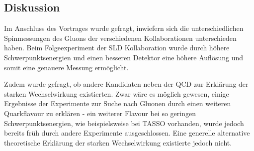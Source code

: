 \subsection{Diskussion}
Im Anschluss des Vortrages wurde gefragt, inwiefern sich die unterschiedlichen Spinmessungen des Gluons der verschiedenen Kollaborationen unterschieden haben.
Beim Folgeexperiment der SLD Kollaboration wurde durch höhere Schwerpunktsenergien und einen besseren Detektor eine höhere Auflösung und somit eine genauere Messung ermöglicht.

Zudem wurde gefragt, ob andere Kandidaten neben der QCD zur Erklärung der starken Wechselwirkung existierten.
Zwar wäre es möglich gewesen, einige Ergebnisse der Experimente zur Suche nach Gluonen durch einen weiteren Quarkflavour zu erklären - ein weiterer Flavour bei so geringen Schwerpunktsenergien, wie beispielsweise bei TASSO vorhanden, wurde jedoch bereits früh durch andere Experimente ausgeschlossen.
Eine generelle alternative theoretische Erklärung der starken Wechselwirkung existierte jedoch nicht.
